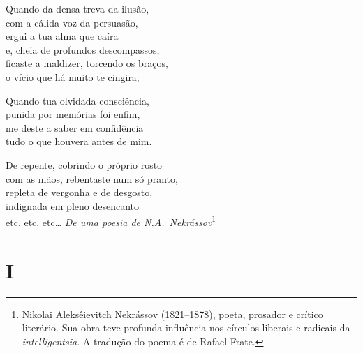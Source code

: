 Quando da densa treva da ilusão,\\
com a cálida voz da persuasão,\\
ergui a tua alma que caíra\\
e, cheia de profundos descompassos,\\
ficaste a maldizer, torcendo os braços,\\
o vício que há muito te cingira;

Quando tua olvidada consciência,\\
punida por memórias foi enfim,\\
me deste a saber em confidência\\
tudo o que houvera antes de mim.

De repente, cobrindo o próprio rosto\\
com as mãos, rebentaste num só pranto,\\
repleta de vergonha e de desgosto,\\
indignada em pleno desencanto\\
etc. etc. etc\ldots{}
\textit{De uma poesia de N.A.~Nekrássov}\footnote{Nikolai
Aleksêievitch Nekrássov (1821--1878), poeta, prosador e crítico literário. Sua
obra teve profunda influência nos círculos liberais e radicais da
\textit{intelligentsia}. A tradução do poema é de Rafael Frate.}

\medskip

\section{I}

